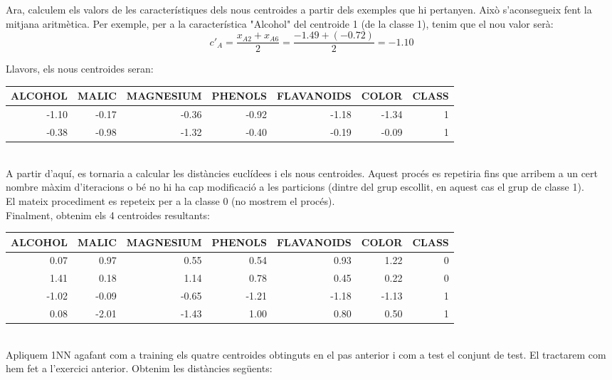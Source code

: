 \documentclass{article} %
\begin{document}
{	Ara, calculem els valors de les característiques dels nous centroides a partir dels exemples que hi pertanyen. Això s'aconsegueix fent la mitjana aritmètica. Per exemple, per a la característica "Alcohol" del centroide 1 (de la classe 1), tenim que el nou valor serà: \\

	\[c'_A = \frac{x_{A2} + x_{A6}}{2} = \frac{-1.49 + (-0.72)}{2}=-1.10\]

	Llavors, els nous centroides seran: \\

	{\selectfont\small
	\begin{tabular}{r r r r r r r}
	 	ALCOHOL & MALIC & MAGNESIUM & PHENOLS & FLAVANOIDS & COLOR & CLASS \\ \hline
		-1.10 & -0.17 & -0.36 & -0.92 & -1.18 & -1.34 & 1 \\
		-0.38 & -0.98 & -1.32 & -0.40 & -0.19 & -0.09 & 1 \\
	\end{tabular}
	} \\

	A partir d'aquí, es tornaria a calcular les distàncies euclídees i els nous centroides. Aquest procés es repetiria fins que arribem a un cert nombre màxim d'iteracions o bé no hi ha cap modificació a les particions (dintre del grup escollit, en aquest cas el grup de classe 1). \\

	El mateix procediment es repeteix per a la classe 0 (no mostrem el procés). \\

	Finalment, obtenim els 4 centroides resultants:\\

	{\selectfont\small
	\begin{tabular}{r r r r r r r}
	 	ALCOHOL & MALIC & MAGNESIUM & PHENOLS & FLAVANOIDS & COLOR & CLASS \\ \hline
		0.07 & 0.97 & 0.55 & 0.54 & 0.93 & 1.22 & 0 \\
		1.41 & 0.18 & 1.14 & 0.78 & 0.45 & 0.22 & 0 \\
		-1.02 & -0.09 & -0.65 & -1.21 & -1.18 & -1.13 & 1 \\
		0.08 & -2.01 & -1.43 & 1.00 & 0.80 & 0.50 & 1 \\
	\end{tabular}
	} \\

	Apliquem 1NN agafant com a training els quatre centroides obtinguts en el pas anterior i com a test el conjunt de test. El tractarem com hem fet a l'exercici anterior. Obtenim les distàncies següents:\\

}
\end{document}
